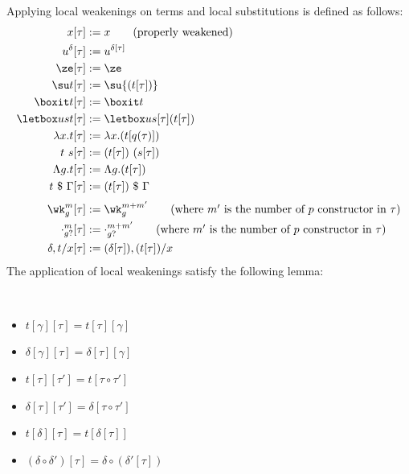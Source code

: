 Applying local weakenings on terms and local substitutions is defined as follows:
\begin{align*}
  x[\tau] &:= x
  \tag{properly weakened} \\
  u^\delta[\tau] &:= u^{\delta[\tau]} \\
  \ze[\tau] &:= \ze \\
  \su t[\tau] &:= \su {(t[\tau])} \\
  \boxit t[\tau] &:= \boxit t \\
  \letbox u s t[\tau] &:= \letbox u {s[\tau]} {(t[\tau])} \\
  \lambda x. t[\tau] &:= \lambda x. {(t[q(\tau)])} \\
  t~s[\tau] &:= (t[\tau])~(s[\tau]) \\
  \Lambda g. t[\tau] &:= \Lambda g. {(t[\tau])} \\
  t~\$~\Gamma[\tau] &:= (t[\tau])~\$~\Gamma \\[0.25em]
  \wk_g^m[\tau] &:= \wk_g^{m + m'}
  \tag{where $m'$ is the number of $p$ constructor in $\tau$} \\
  \cdot_{g?}^m[\tau] &:= \cdot_{g?}^{m + m'}
                       \tag{where $m'$ is the number of $p$ constructor in $\tau$} \\
  \delta, t/x[\tau] &:= (\delta[\tau]), (t[\tau])/x
\end{align*}
The application of local weakenings satisfy the following lemma:
\begin{lemma}$ $
  \begin{itemize}
  \item $t[\gamma][\tau] = t[\tau][\gamma]$
  \item $\delta[\gamma][\tau] = \delta[\tau][\gamma]$
  \item $t[\tau][\tau'] = t[\tau \circ \tau']$
  \item $\delta[\tau][\tau'] = \delta[\tau \circ \tau']$
  \item $t[\delta][\tau] = t[\delta[\tau]]$
  \item $(\delta \circ \delta')[\tau] = \delta \circ (\delta'[\tau])$
  \end{itemize}
\end{lemma}

